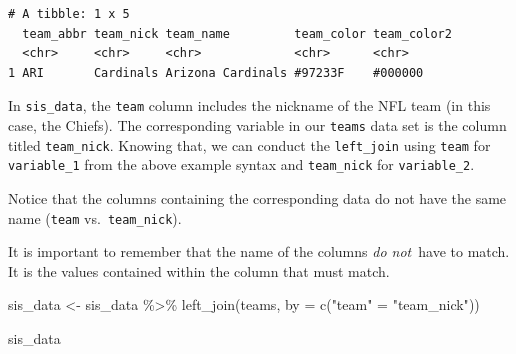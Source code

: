 \documentclass[
  letterpaper,
]{krantz}
\newenvironment{Shaded}{\begin{snugshade}}{\end{snugshade}}
\newcommand{\AttributeTok}[1]{\textcolor[rgb]{0.40,0.45,0.13}{#1}}
\newcommand{\FunctionTok}[1]{\textcolor[rgb]{0.28,0.35,0.67}{#1}}
\newcommand{\NormalTok}[1]{\textcolor[rgb]{0.00,0.23,0.31}{#1}}
\newcommand{\OtherTok}[1]{\textcolor[rgb]{0.00,0.23,0.31}{#1}}
\newcommand{\SpecialCharTok}[1]{\textcolor[rgb]{0.37,0.37,0.37}{#1}}
\newcommand{\StringTok}[1]{\textcolor[rgb]{0.13,0.47,0.30}{#1}}
\begin{document}
\begin{verbatim}
# A tibble: 1 x 5
  team_abbr team_nick team_name         team_color team_color2
  <chr>     <chr>     <chr>             <chr>      <chr>      
1 ARI       Cardinals Arizona Cardinals #97233F    #000000    
\end{verbatim}

In \texttt{sis\_data}, the \texttt{team} column includes the nickname of
the NFL team (in this case, the Chiefs). The corresponding variable in
our \texttt{teams} data set is the column titled \texttt{team\_nick}.
Knowing that, we can conduct the \texttt{left\_join} using \texttt{team}
for \texttt{variable\_1} from the above example syntax and
\texttt{team\_nick} for \texttt{variable\_2}.

\begin{tcolorbox}[enhanced jigsaw, colback=white, leftrule=.75mm, breakable, colframe=quarto-callout-tip-color-frame, bottomtitle=1mm, rightrule=.15mm, left=2mm, opacityback=0, bottomrule=.15mm, arc=.35mm, coltitle=black, colbacktitle=quarto-callout-tip-color!10!white, toptitle=1mm, titlerule=0mm, title=\textcolor{quarto-callout-tip-color}{\faLightbulb}\hspace{0.5em}{Tip}, toprule=.15mm, opacitybacktitle=0.6]

Notice that the columns containing the corresponding data do not have
the same name (\texttt{team} vs.~\texttt{team\_nick}).

It is important to remember that the name of the columns \emph{do
not}~have to match. It is the values contained within the column that
must match.

\end{tcolorbox}

\begin{Shaded}
\begin{Highlighting}[]
\NormalTok{sis\_data }\OtherTok{\textless{}{-}}\NormalTok{ sis\_data }\SpecialCharTok{\%\textgreater{}\%}
  \FunctionTok{left\_join}\NormalTok{(teams, }\AttributeTok{by =} \FunctionTok{c}\NormalTok{(}\StringTok{"team"} \OtherTok{=} \StringTok{"team\_nick"}\NormalTok{))}

\NormalTok{sis\_data}
\end{Highlighting}
\end{Shaded}
\end{document}
